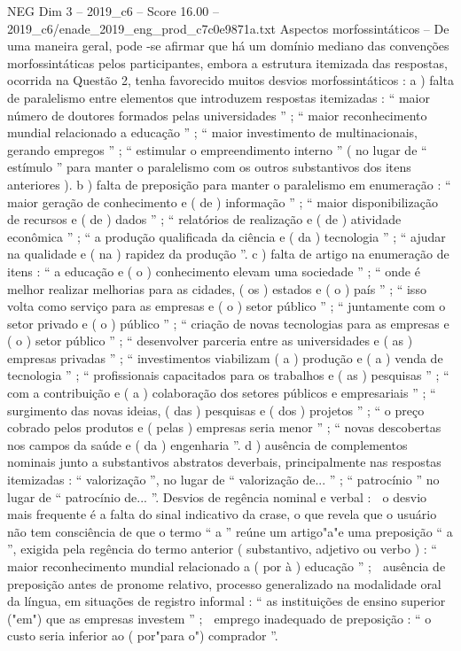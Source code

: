 \begin{textsample}{NEG Dim 3 – 2019\_c6 – Score 16.00 – 2019\_c6/enade\_2019\_eng\_prod\_c7c0e9871a.txt}
Aspectos morfossintáticos – De uma maneira geral, pode -se afirmar que há um domínio mediano das convenções morfossintáticas pelos participantes, embora a estrutura itemizada das respostas, ocorrida na Questão 2, tenha favorecido muitos desvios morfossintáticos : a ) falta de paralelismo entre elementos que introduzem respostas itemizadas : “ maior número de doutores formados pelas universidades ” ; “ maior reconhecimento mundial relacionado a educação ” ; “ maior investimento de multinacionais, gerando empregos ” ; “ estimular o empreendimento interno ” ( no lugar de “ estímulo ” para manter o paralelismo com os outros substantivos dos itens anteriores ). b ) falta de preposição para manter o paralelismo em enumeração : “ maior geração de conhecimento e ( de ) informação ” ; “ maior disponibilização de recursos e ( de ) dados ” ; “ relatórios de realização e ( de ) atividade econômica ” ; “ a produção qualificada da ciência e ( da ) tecnologia ” ; “ ajudar na qualidade e ( na ) rapidez da produção ”. c ) falta de artigo na enumeração de itens : “ a educação e ( o ) conhecimento elevam uma sociedade ” ; “ onde é melhor realizar melhorias para as cidades, ( os ) estados e ( o ) país ” ; “ isso volta como serviço para as empresas e ( o ) setor público ” ; “ juntamente com o setor privado e ( o ) público ” ; “ criação de novas tecnologias para as empresas e ( o ) setor público ” ; “ desenvolver parceria entre as universidades e ( as ) empresas privadas ” ; “ investimentos viabilizam ( a ) produção e ( a ) venda de tecnologia ” ; “ profissionais capacitados para os trabalhos e ( as ) pesquisas ” ; “ com a contribuição e ( a ) colaboração dos setores públicos e empresariais ” ; “ surgimento das novas ideias, ( das ) pesquisas e ( dos ) projetos ” ; “ o preço cobrado pelos produtos e ( pelas ) empresas seria menor ” ; “ novas descobertas nos campos da saúde e ( da ) engenharia ”. d ) ausência de complementos nominais junto a substantivos abstratos deverbais, principalmente nas respostas itemizadas : “ valorização ”, no lugar de “ valorização de... ” ; “ patrocínio ” no lugar de “ patrocínio de... ”.
Desvios de regência nominal e verbal :  o desvio mais frequente é a falta do sinal indicativo da crase, o que revela que o usuário não tem consciência de que o termo “ a ” reúne um artigo"a"e uma preposição “ a ”, exigida pela regência do termo anterior ( substantivo, adjetivo ou verbo ) : “ maior reconhecimento mundial relacionado a ( por à ) educação ” ;  ausência de preposição antes de pronome relativo, processo generalizado na modalidade oral da língua, em situações de registro informal : “ as instituições de ensino superior ("em") que as empresas investem ” ;  emprego inadequado de preposição : “ o custo seria inferior ao ( por"para o") comprador ”.

\end{textsample}
